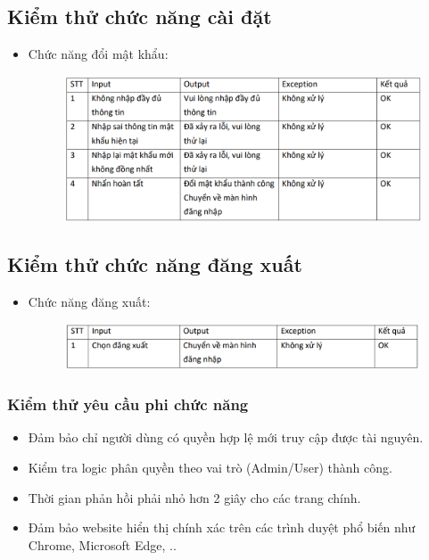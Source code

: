 \documentclass{article}
\begin{document}
\subsection{Kiểm thử chức năng cài đặt}
\begin{itemize}
    \item Chức năng đổi mật khẩu:
    \begin{figure}[H]
        \centering
        \includegraphics[width=1\textwidth]{Kiểm thử/Kiểm thử đổi mk.png}
    \end{figure}   
\end{itemize}
\subsection{Kiểm thử chức năng đăng xuất}
\begin{itemize}
    \item Chức năng đăng xuất:
    \begin{figure}[H]
        \centering
        \includegraphics[width=1\textwidth]{Kiểm thử/KT đăng xuất.png}
    \end{figure}   
\end{itemize}
\subsubsection{Kiểm thử yêu cầu phi chức năng}
\begin{itemize}
    \item Đảm bảo chỉ người dùng có quyền hợp lệ mới truy cập được tài nguyên.
    \item Kiểm tra logic phân quyền theo vai trò (Admin/User) thành công.
    \item Thời gian phản hồi phải nhỏ hơn 2 giây cho các trang chính. 
    \item Đảm bảo website hiển thị chính xác trên các trình duyệt phổ biến như Chrome, Microsoft Edge, ..
\end{itemize}
\end{document}
